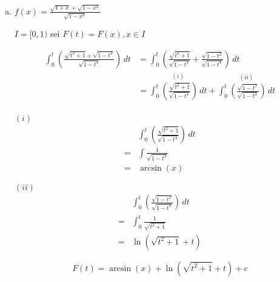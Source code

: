 \documentclass{article}
\begin{document}
\begin{enumerate}[a)]
\newpage
\item $f(x) = \frac{\sqrt{1 + x} + \sqrt{1 - x^2}}{\sqrt{1 - x^4}}$

  $I = [0, 1)$ sei $F(t) = F(x), x \in I$

  \begin{align*}
    \int_0^t \left( \frac{\sqrt{t^2 + 1} + \sqrt{1 - t^2}}{\sqrt{1 - t^4}}\right) \,dt
    &= \int_0^t \left( \frac{\sqrt{t^2 + 1}}{\sqrt{1 - t^4}} + \frac{\sqrt{1 - t^2}}{\sqrt{1 - t^4}}\right) \,dt \\
    &= \overset{(i)}{\int_0^t \left( \frac{\sqrt{t^2 + 1}}{\sqrt{1 - t^4}}\right) \,dt} +
       \overset{(ii)}{\int_0^t \left(\frac{\sqrt{1 - t^2}}{\sqrt{1 - t^4}}\right) \,dt} \\
  \end{align*}
  \begin{minipage}[t]{.45\textwidth}
    \textbf{$(i)$}
    \begin{align*}
      &\int_0^t \left( \frac{\sqrt{t^2 + 1}}{\sqrt{1 - t^4}}\right) \,dt \\
      = & \int \frac{1}{\sqrt{1 - t^2}} \\
      = & \arcsin (x)
    \end{align*}
  \end{minipage}
  \hfill
  \begin{minipage}[t]{.45\textwidth}
    \textbf{$(ii)$}
    \begin{align*}
      &\int_0^t \left( \frac{\sqrt{1 - t^2}}{\sqrt{1 - t^4}}\right) \,dt \\
      = & \int_0^t \frac{1}{\sqrt{t^2 + 1}} \\
      = & \ln \left( \sqrt{t^2 + 1} + t\right)
    \end{align*}
  \end{minipage}
  \[
    F(t) = \arcsin (x) + \ln \left( \sqrt{t^2 + 1} + t\right) + c
  \]
\end{enumerate}
\end{document}
